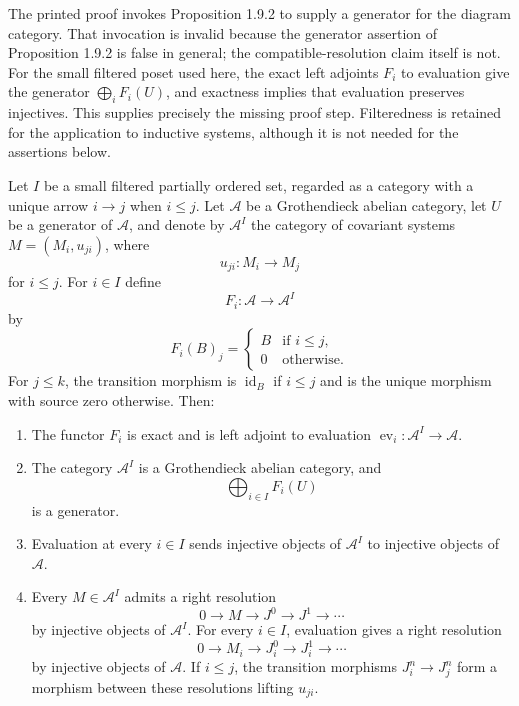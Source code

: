 \begin{lemma}
\label{lemma-filtered-diagram-injective-resolutions}
\begin{reference}
\cite[Chapter III, \S 3.6, proof of Proposition 3.6.2, p. 169]{Tohoku}
\end{reference}
\begin{history}
The printed proof invokes Proposition 1.9.2 to supply a generator for the
diagram category. That invocation is invalid because the generator assertion
of Proposition 1.9.2 is false in general; the compatible-resolution claim
itself is not. For the small filtered poset used here, the exact left adjoints
$F_i$ to evaluation give the generator $\bigoplus_i F_i(U)$, and exactness
implies that evaluation preserves injectives. This supplies precisely the
missing proof step. Filteredness is retained for the application to inductive
systems, although it is not needed for the assertions below.
\end{history}
Let $I$ be a small filtered partially ordered set, regarded as a category with
a unique arrow $i \to j$ when $i \leq j$. Let $\mathcal{A}$ be a
Grothendieck abelian category, let $U$ be a generator of $\mathcal{A}$, and
denote by $\mathcal{A}^I$ the category of covariant systems
$M = (M_i, u_{ji})$, where
$$
u_{ji} : M_i \longrightarrow M_j
$$
for $i \leq j$. For $i \in I$ define
$$
F_i : \mathcal{A} \longrightarrow \mathcal{A}^I
$$
by
$$
F_i(B)_j =
\begin{cases}
B & \text{if } i \leq j, \\
0 & \text{otherwise.}
\end{cases}
$$
For $j \leq k$, the transition morphism is $\operatorname{id}_B$ if
$i \leq j$ and is the unique morphism with source zero otherwise. Then:
\begin{enumerate}
\item The functor $F_i$ is exact and is left adjoint to evaluation
$\operatorname{ev}_i : \mathcal{A}^I \to \mathcal{A}$.
\item The category $\mathcal{A}^I$ is a Grothendieck abelian category, and
$$
\bigoplus_{i \in I} F_i(U)
$$
is a generator.
\item Evaluation at every $i \in I$ sends injective objects of
$\mathcal{A}^I$ to injective objects of $\mathcal{A}$.
\item Every $M \in \mathcal{A}^I$ admits a right resolution
$$
0 \longrightarrow M \longrightarrow J^0 \longrightarrow J^1
\longrightarrow \cdots
$$
by injective objects of $\mathcal{A}^I$. For every $i \in I$, evaluation
gives a right resolution
$$
0 \longrightarrow M_i \longrightarrow J_i^0 \longrightarrow J_i^1
\longrightarrow \cdots
$$
by injective objects of $\mathcal{A}$. If $i \leq j$, the transition
morphisms $J_i^n \to J_j^n$ form a morphism between these resolutions lifting
$u_{ji}$.
\end{enumerate}
\end{lemma}

